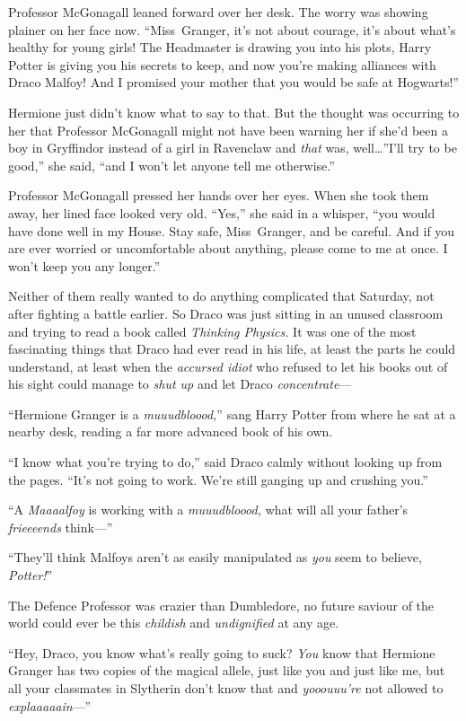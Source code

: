 Professor McGonagall leaned forward over her desk. The worry was showing
plainer on her face now. “Miss~Granger, it’s not about courage, it’s about
what’s healthy for young girls! The Headmaster is drawing you into his plots,
Harry Potter is giving you his secrets to keep, and now you’re making alliances
with Draco Malfoy! And I promised your mother that you would be safe at
Hogwarts!”

Hermione just didn’t know what to say to that. But the thought was occurring to
her that Professor McGonagall might not have been warning her if she’d been a
boy in Gryffindor instead of a girl in Ravenclaw and \emph{that} was,
well…”I’ll try to be good,” she said, “and I won’t let anyone tell me
otherwise.”

Professor McGonagall pressed her hands over her eyes. When she took them away,
her lined face looked very old. “Yes,” she said in a whisper, “you would have
done well in my House. Stay safe, Miss~Granger, and be careful. And if you are
ever worried or uncomfortable about anything, please come to me at once. I
won’t keep you any longer.”

Neither of them really wanted to do anything complicated that Saturday, not
after fighting a battle earlier. So Draco was just sitting in an unused
classroom and trying to read a book called \emph{Thinking Physics.} It was one
of the most fascinating things that Draco had ever read in his life, at least
the parts he could understand, at least when the \emph{accursed idiot} who
refused to let his books out of his sight could manage to \emph{shut up} and
let Draco \emph{concentrate}—

“Hermione Granger is a \emph{muuudbloood,}” sang Harry Potter from where he sat
at a nearby desk, reading a far more advanced book of his own.

“I know what you’re trying to do,” said Draco calmly without looking up from
the pages. “It’s not going to work. We’re still ganging up and crushing you.”

“A \emph{Maaaalfoy} is working with a \emph{muuudbloood,} what will all your
father’s \emph{frieeeends} think—”

“They’ll think Malfoys aren’t as easily manipulated as \emph{you} seem to
believe, \emph{Potter!}”

The Defence Professor was crazier than Dumbledore, no future saviour of the
world could ever be this \emph{childish} and \emph{undignified} at any age.

“Hey, Draco, you know what’s really going to suck? \emph{You} know that
Hermione Granger has two copies of the magical allele, just like you and just
like me, but all your classmates in Slytherin don’t know that and
\emph{yooouuu’re} not allowed to \emph{explaaaaain}—”


